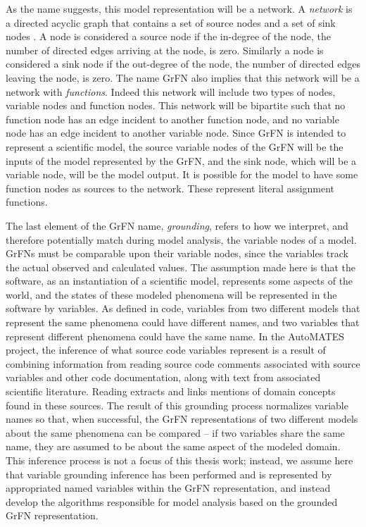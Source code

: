 As the name suggests, this model representation will be a network.
A \emph{network} is a directed acyclic graph that contains a set of source nodes and a set of sink nodes \citep{bondy1976graph}.
A node is considered a source node if the in-degree of the node, the number of directed edges arriving at the node, is zero.
Similarly a node is considered a sink node if the out-degree of the node, the number of directed edges leaving the node, is zero.
The name GrFN also implies that this network will be a network with \emph{functions}.
Indeed this network will include two types of nodes, variable nodes and function nodes.
This network will be bipartite such that no function node has an edge incident to another function node, and no variable node has an edge incident to another variable node.
Since GrFN is intended to represent a scientific model, the source variable nodes of the GrFN will be the inputs of the model represented by the GrFN, and the sink node, which will be a variable node, will be the model output.
It is possible for the model to have some function nodes as sources to the network.
These represent literal assignment functions.

The last element of the GrFN name, \emph{grounding}, refers to how we interpret, and therefore potentially match during model analysis, the variable nodes of a model.
GrFNs must be comparable upon their variable nodes, since the variables track the actual observed and calculated values.
The assumption made here is that the software, as an instantiation of a scientific model, represents some aspects of the world, and the states of these modeled phenomena will be represented in the software by variables.
As defined in code, variables from two different models that represent the same phenomena could have different names, and two variables that represent different phenomena could have the same name.
In the AutoMATES project, the inference of what source code variables represent is a result of combining information from reading source code comments associated with source variables and other code documentation, along with text from associated scientific literature. Reading extracts and links mentions of domain concepts found in these sources. The result of this grounding process normalizes variable names so that, when successful, the GrFN representations of two different models about the same phenomena can be compared -- if two variables share the same name, they are assumed to be about the same aspect of the modeled domain. This inference process is not a focus of this thesis work; instead, we assume here that variable grounding inference has been performed and is represented by appropriated named variables within the GrFN representation, and instead develop the algorithms responsible for model analysis based on the grounded GrFN representation.



